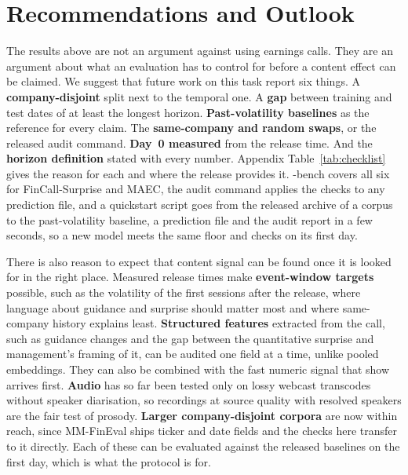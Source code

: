 \section{Recommendations and Outlook}
\label{sec:recommendations}

The results above are not an argument against using earnings calls. They are an
argument about what an evaluation has to control for before a content effect can
be claimed. We suggest that future work on this task report six things. A
\textbf{company-disjoint} split next to the temporal one. A \textbf{gap} between
training and test dates of at least the longest horizon. \textbf{Past-volatility
baselines} as the reference for every claim. The \textbf{same-company and random
swaps}, or the released audit command. \textbf{Day~0 measured} from the release
time. And the \textbf{horizon definition} stated with every number. Appendix
Table~\ref{tab:checklist} gives the reason for each and where the release provides
it. \ecvol-bench covers all six for FinCall-Surprise and MAEC, the audit command
applies the checks to any prediction file, and a quickstart script goes from the
released archive of a corpus to the past-volatility baseline, a prediction file
and the audit report in a few seconds, so a new model meets the same floor and
checks on its first day.

There is also reason to expect that content signal can be found once it is
looked for in the right place. Measured release times make
\textbf{event-window targets} possible, such as the volatility of the first
sessions after the release, where language about guidance and surprise should
matter most and where same-company history explains least. \textbf{Structured
features} extracted from the call, such as guidance changes and the gap between
the quantitative surprise and management's framing of it, can be audited one
field at a time, unlike pooled embeddings. They can also be combined with the
fast numeric signal that \citet{fastnumbers2026} show arrives first. \textbf{Audio}
has so far been tested only on lossy webcast transcodes without speaker
diarisation, so recordings at source quality with resolved speakers are the fair
test of prosody. \textbf{Larger company-disjoint corpora} are now within reach,
since MM-FinEval \citep{mmfineval2026} ships ticker and date fields and the checks
here transfer to it directly. Each of these can be evaluated against the
released baselines on the first day, which is what the protocol is for.

